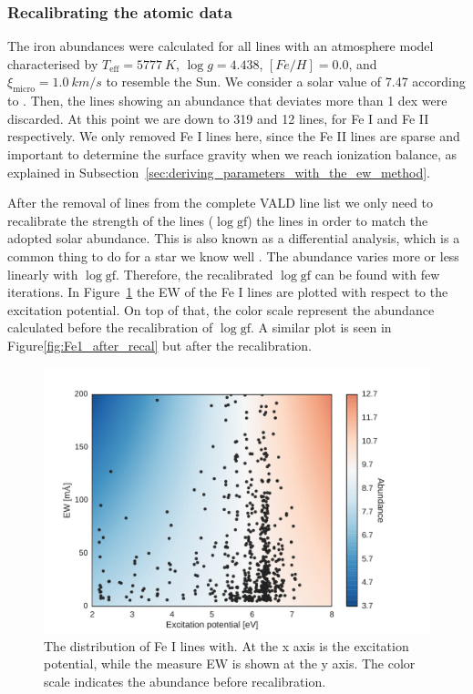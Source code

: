 \documentclass{aa}
\begin{document}
\subsubsection{Recalibrating the atomic data}
\label{ssub:Recalibrating-the-atomic-data}

The iron abundances were calculated for all lines with an atmosphere
model characterised by $T_\mathrm{eff}=\SI{5777}{K}$, $\log g =
4.438$, $[Fe/H] = 0.0$, and $\xi_\mathrm{micro} = \SI{1.0}{km/s}$
to resemble the Sun. We consider a solar value of 7.47 according to
\cite{Gonzales2000}. Then, the lines showing an abundance that deviates
more than 1 dex were discarded. At this point we are down to 319 and 12
lines, for Fe I and Fe II respectively. We only removed Fe I lines here,
since the Fe II lines are sparse and important to determine the surface
gravity when we reach ionization balance, as explained in
Subsection~\ref{sec:deriving_parameters_with_the_ew_method}.

After the removal of lines from the complete VALD line list we only need
to recalibrate the strength of the lines ($\log \mathrm{gf}$) the lines
in order to match the adopted solar abundance. This is also known as a
differential analysis, which is a common thing to do for a star we know
well \citep{Onehag2012}. The abundance varies more or less linearly
with $\log \mathrm{gf}$. Therefore, the recalibrated $\log \mathrm{gf}$
can be found with few iterations. In Figure~\ref{fig:Fe1_before_recal}
the EW of the Fe I lines are plotted with respect to the excitation
potential. On top of that, the color scale represent the abundance
calculated before the recalibration of $\log \mathrm{gf}$. A similar
plot is seen in Figure\ref{fig:Fe1_after_recal} but after the
recalibration.

\begin{figure}[htpb]
    \centering
    \includegraphics[width=0.9\linewidth]{figures/EWvsEP.pdf}
    \caption{The distribution of Fe I lines with. At the x axis is the
    excitation potential, while the measure EW is shown at the y axis. The
    color scale indicates the abundance before recalibration.}
    \label{fig:Fe1_before_recal}
\end{figure}
\end{document}

